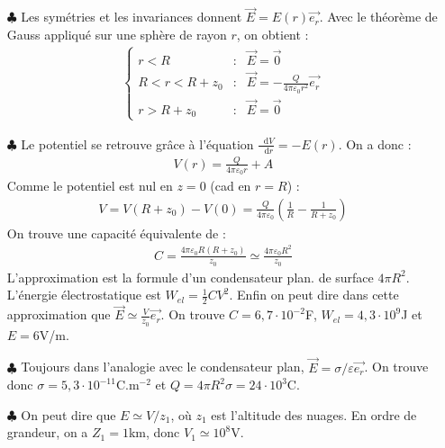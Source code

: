 \documentclass{report}
\newcommand*\dif{\mathop{}\!\mathrm{d}}
\begin{document}
\begin{itemize}

	\item[$\clubsuit$] Les symétries et les invariances donnent $\vec{E}=E(r)\vec{e_r}$. Avec le théorème de Gauss appliqué sur une sphère de rayon $r$, on obtient :
	\begin{align*}
	\left\lbrace
	\begin{array}{ccc}
	r<R & : & \vec{E}=\vec{0} \\
	R<r<R+z_0 & : & \vec{E} = -\frac{Q}{4\pi\varepsilon_0 r^2}\vec{e_r} \\
	r>R+z_0 & : & \vec{E}=\vec{0}
	\end{array}\right.
\end{align*}

	\item[$\clubsuit$] Le potentiel se retrouve grâce à l'équation $\frac{\dif V}{\dif r}=-E(r)$. On a donc :
	\begin{align*}
		V(r) = \frac{Q}{4\pi\varepsilon_0 r}+A
	\end{align*}
Comme le potentiel est nul en $z=0$ (cad en $r=R$) :
	\begin{align*}
		V = V(R+z_0)-V(0) = \frac{Q}{4\pi\varepsilon_0}\left(\frac{1}{R}-\frac{1}{R+z_0} \right) 
	\end{align*}
On trouve une capacité équivalente de :
	\begin{align*}
		C = \frac{4\pi\varepsilon_0R(R+z_0)}{z_0}\simeq\frac{4\pi\varepsilon_0R^2}{z_0}
	\end{align*}
	L'approximation est la formule d'un condensateur plan. de surface $4\pi R^2$. L'énergie électrostatique est $W_{el}=\frac{1}{2}CV^2$. Enfin on peut dire dans cette approximation que $\vec{E}\simeq\frac{V}{z_0}\vec{e_r}$. On trouve $C=6,7\cdot10^{-2}$F, $W_{el}=4,3\cdot10^{9}$J et $E=6$V/m.
	
	\item[$\clubsuit$] Toujours dans l'analogie avec le condensateur plan, $\vec{E}=\sigma/\varepsilon\vec{e_r}$. On trouve donc $\sigma=5,3\cdot10^{-11}$C.m$^{-2}$ et $Q=4\pi R^2\sigma=24\cdot10^{3}$C.
	
	\item[$\clubsuit$] On peut dire que $E\simeq V/z_1$, où $z_1$ est l'altitude des nuages. En ordre de grandeur, on a $Z_1=1$km, donc $V_1\simeq10^8$V.
	
\end{itemize}
\end{document}

